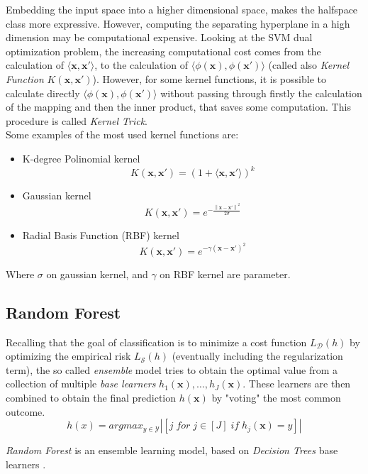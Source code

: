 Embedding the input space into a higher dimensional space, makes the halfspace class more expressive. However, computing the separating hyperplane in a high dimension may be computational expensive. Looking at the \ac{SVM} dual optimization problem, the increasing computational cost comes from the calculation of $\langle \mathbf{x}, \mathbf{x}' \rangle$, to the calculation of $\langle \phi(\mathbf{x}), \phi(\mathbf{x}') \rangle$ (called also \textit{Kernel Function} $K(\mathbf{x}, \mathbf{x}')$). However, for some kernel functions, it is possible to calculate directly $\langle \phi(\mathbf{x}), \phi(\mathbf{x}') \rangle$ without passing through firstly the calculation of the mapping and then the inner product, that saves some computation. This procedure is called \textit{Kernel Trick}.\\
Some examples of the  most used kernel functions are:
\begin{itemize}
	\item K-degree Polinomial kernel
	\[K(\mathbf{x}, \mathbf{x}') = (1 + \langle \mathbf{x}, \mathbf{x}' \rangle)^k\]
	\item Gaussian kernel 
	\[K(\mathbf{x}, \mathbf{x}') = e^{- \frac{\left\lVert \mathbf{x} - \mathbf{x}' \right\rVert^2}{2 \sigma}} \]
	\item Radial Basis Function (RBF) kernel
	\[K(\mathbf{x}, \mathbf{x}') = e^{- \gamma \left( \mathbf{x} - \mathbf{x}' \right)^2} \]
\end{itemize}
Where $\sigma$ on gaussian kernel, and $\gamma$ on RBF kernel are parameter.


\subsection{Random Forest}

Recalling that the goal of classification is to minimize a cost function $L_\mathcal{D}(h)$ by optimizing the empirical risk $L_\mathcal{S}(h)$ (eventually including the regularization term), the so called \textit{ensemble} model tries to obtain the optimal value from a collection of multiple \textit{base learners} $h_1(\mathbf{x}), \dots, h_J(\mathbf{x})$. These learners are then combined to obtain the final prediction $h(\mathbf{x})$ by "voting" the most common outcome.
\[ h(x) = argmax_{y \in \mathcal{Y}} |[j \; for \; j \in [J] \; if \; h_j(\mathbf{x}) = y]| \] 

\textit{Random Forest} is an ensemble learning model, based on \textit{Decision Trees} base learners \cite{inbook}.

